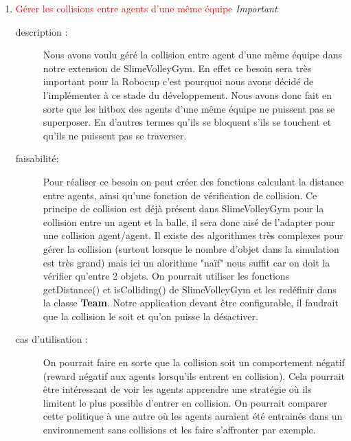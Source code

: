 \documentclass[11pt, a4paper]{article}
\newcommand{\besoinVItem}[4]{
	\item #1
	\begin{description}
		\item[description :]
		#2
		\item[faisabilité: ]
		#3
		\item[cas d'utilisation :]
		#4
	\end{description}
}
\begin{document}
\begin{enumerate}
		\besoinVItem{\textcolor{red}{Gérer les collisions entre agents d'une même équipe} \textit{Important}}
		{
			Nous avons voulu géré la collision entre agent d'une même équipe dans notre extension de SlimeVolleyGym. En effet ce besoin sera très important pour la Robocup c'est pourquoi nous avons décidé de l'implémenter à ce stade du
			développement. Nous avons donc fait en sorte que les hitbox des agents d'une même équipe ne puissent pas se superposer. En d'autres termes qu'ils se bloquent s'ils se touchent et qu'ils ne puissent pas se traverser.
		}
		{
			Pour réaliser ce besoin on peut créer des fonctions calculant la distance entre agents, ainsi qu'une fonction de vérification de collision. Ce principe de collision est déjà présent dans SlimeVolleyGym pour la collision entre un agent et la balle, il sera donc aisé de l'adapter pour une collision agent/agent. Il existe des algorithmes très complexes pour gérer la collision (surtout lorsque le nombre d'objet dans la simulation est très grand) mais ici un alorithme "naïf" nous suffit car on doit la vérifier qu'entre 2 objets.
		On pourrait utiliser les fonctions getDistance() et isColliding() de SlimeVolleyGym et les redéfinir dans la classe \textbf{Team}.
		Notre application devant être configurable, il faudrait que la collision le soit et qu'on puisse la désactiver.
		}
		{
			On pourrait faire en sorte que la collision soit un comportement négatif (reward négatif aux agents lorsqu'ils entrent en collision). Cela pourrait être intéressant de voir les agents apprendre une stratégie où ils limitent le plus possible d'entrer en collision. On pourrait comparer cette politique à une autre où les agents auraient été entrainés dans un environnement sans collisions et les faire s'affronter par exemple.
		}

	\end{enumerate}
\end{document}

